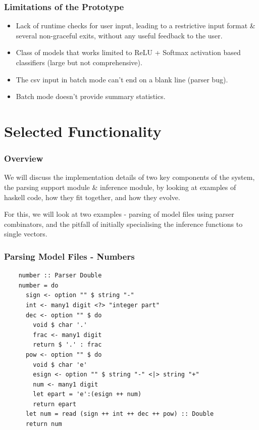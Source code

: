 \documentclass{beamer}
\begin{document}
\begin{frame}
  \frametitle{Limitations of the Prototype}

  \begin{itemize}
    \item Lack of runtime checks for user input, leading to a restrictive input format \& several non-graceful exits, without any useful feedback to the user.
    \item Class of models that works limited to ReLU + Softmax activation based classifiers (large but not comprehensive).
    \item The csv input in batch mode can't end on a blank line (parser bug).
    \item Batch mode doesn't provide summary statistics.
  \end{itemize}

\end{frame}

\section {Selected Functionality}

\begin{frame}
  \frametitle{Overview}

  We will discuss the implementation details of two key components of the system, the parsing support module \& inference module, by looking at examples of haskell code, how they fit together, and how they evolve.\bigskip

  \pause

  For this, we will look at two examples - parsing of model files using parser combinators, and the pitfall of initially specialising the inference functions to single vectors.

\end{frame}

\begin{frame}[fragile]
  \frametitle{Parsing Model Files - Numbers}

  \begin{lstlisting}
    number :: Parser Double
    number = do
      sign <- option "" $ string "-"
      int <- many1 digit <?> "integer part"
      dec <- option "" $ do
        void $ char '.'
        frac <- many1 digit
        return $ '.' : frac
      pow <- option "" $ do
        void $ char 'e'
        esign <- option "" $ string "-" <|> string "+"
        num <- many1 digit
        let epart = 'e':(esign ++ num)
        return epart
      let num = read (sign ++ int ++ dec ++ pow) :: Double
      return num	
  \end{lstlisting}

\end{frame}
\end{document}
